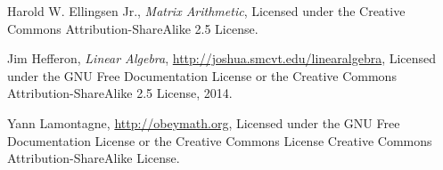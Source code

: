 \onecolumn
{}
\begin{thebibliography}{9}

Harold W. Ellingsen Jr.,
\emph{Matrix Arithmetic},
Licensed under the
Creative Commons Attribution-ShareAlike 2.5 License.
 

Jim Hefferon,
\emph{Linear Algebra},
\url{http://joshua.smcvt.edu/linearalgebra},
Licensed under the GNU Free Documentation License or the 
Creative Commons Attribution-ShareAlike 2.5 License,
2014.

Yann Lamontagne,
\url{http://obeymath.org},
Licensed under the GNU Free Documentation License or the 
Creative Commons License Creative Commons Attribution-ShareAlike License.

\end{thebibliography}

